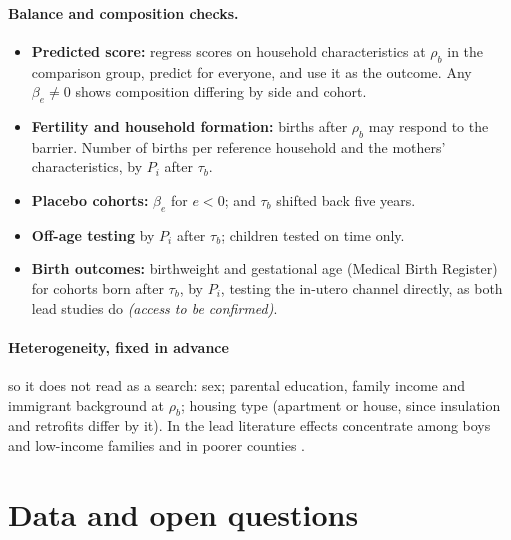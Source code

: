 \documentclass[11pt]{article}
\begin{document}
\paragraph{Balance and composition checks.}
\begin{itemize}
\item \textbf{Predicted score:} regress scores on household characteristics at \(\rho_b\) in the
  comparison group, predict for everyone, and use it as the outcome. Any \(\beta_e \neq 0\)
  shows composition differing by side and cohort.
\item \textbf{Fertility and household formation:} births after \(\rho_b\) may respond to the
  barrier. Number of births per reference household and the mothers' characteristics, by
  \(P_i\) after \(\tau_b\).
\item \textbf{Placebo cohorts:} \(\beta_e\) for \(e < 0\); and \(\tau_b\) shifted back five years.
\item \textbf{Off-age testing} by \(P_i\) after \(\tau_b\); children tested on time only.
\item \textbf{Birth outcomes:} birthweight and gestational age (Medical Birth Register) for
  cohorts born after \(\tau_b\), by \(P_i\), testing the in-utero channel directly, as both lead
  studies do \emph{(access to be confirmed)}.
\end{itemize}

\paragraph{Heterogeneity, fixed in advance} so it does not read as a search: sex; parental
education, family income and immigrant background at \(\rho_b\); housing type (apartment or
house, since insulation and retrofits differ by it). In the lead literature effects concentrate
among boys and low-income families \autocite{gronqvistUnderstandingHowLow2020} and in poorer
counties \autocite{hollingsworthThousandCutsCumulative2025}.

\section{Data and open questions}\label{sec:data}
\end{document}
